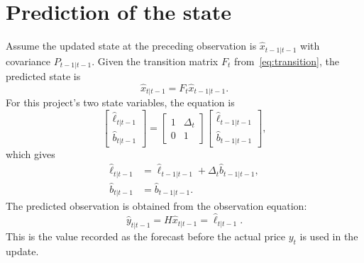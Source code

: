 \documentclass[12pt,a4paper,oneside]{report}
\numberwithin{equation}{chapter}
\numberwithin{figure}{chapter}
\numberwithin{table}{chapter}
\theoremstyle{definition}
\theoremstyle{plain}
\newcommand{\1}{\mathbf{1}}
\newcommand{\hatt}[1]{\widehat{#1}}
\begin{document}
\section{Prediction of the state}
Assume the updated state at the preceding observation is $\hatt{x}_{t-1|t-1}$ with covariance $P_{t-1|t-1}$. Given the transition matrix $F_t$ from~\eqref{eq:transition}, the predicted state is
\begin{equation}
  \hatt{x}_{t|t-1}=F_t\hatt{x}_{t-1|t-1}.
  \label{eq:predstate}
\end{equation}
For this project's two state variables, the equation is
\[
  \begin{bmatrix}\hatt{\ell}_{t|t-1}\\\hatt{b}_{t|t-1}\end{bmatrix}
  =\begin{bmatrix}1&\Delta_t\\0&1\end{bmatrix}
  \begin{bmatrix}\hatt{\ell}_{t-1|t-1}\\\hatt{b}_{t-1|t-1}\end{bmatrix},
\]
which gives
\begin{align}
  \hatt{\ell}_{t|t-1}&=\hatt{\ell}_{t-1|t-1}+\Delta_t\hatt{b}_{t-1|t-1},\\
  \hatt{b}_{t|t-1}&=\hatt{b}_{t-1|t-1}.
\end{align}
The predicted observation is obtained from the observation equation:
\begin{equation}
  \hatt{y}_{t|t-1}=H\hatt{x}_{t|t-1}=\hatt{\ell}_{t|t-1}.
  \label{eq:predobs}
\end{equation}
This is the value recorded as the forecast before the actual price $y_t$ is used in the update.
\end{document}
